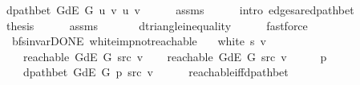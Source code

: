 \begin{isabellebody}
\ {\isachardoublequoteopen}dpath{\isacharunderscore}{\kern0pt}bet\ {\isacharparenleft}{\kern0pt}G{\isachardot}{\kern0pt}dE\ G{\isacharparenright}{\kern0pt}\ {\isacharbrackleft}{\kern0pt}u{\isacharcomma}{\kern0pt}\ v{\isacharbrackright}{\kern0pt}\ u\ v{\isachardoublequoteclose}\isanewline
\ \ \ \ \isamarkupfalse%
\ assms{\isacharparenleft}{\kern0pt}{}{\isacharparenright}{\kern0pt}\isanewline
\ \ \ \ \isamarkupfalse%
\ {\isacharparenleft}{\kern0pt}intro\ edges{\isacharunderscore}{\kern0pt}are{\isacharunderscore}{\kern0pt}dpath{\isacharunderscore}{\kern0pt}bet{\isacharparenright}{\kern0pt}\isanewline
\ \ \isamarkupfalse%
\ {\isacharquery}{\kern0pt}thesis\isanewline
\ \ \ \ \isamarkupfalse%
\ assms{\isacharparenleft}{\kern0pt}{}{\isacharcomma}{\kern0pt}\ {}{\isacharparenright}{\kern0pt}\isanewline
\ \ \ \ \isamarkupfalse%
\ d{\isacharunderscore}{\kern0pt}triangle{\isacharunderscore}{\kern0pt}inequality\isanewline
\ \ \ \ \isamarkupfalse%
\ fastforce\isanewline
{}\isamarkupfalse%
%
\endisatagproof
{\isafoldproof}%
%
\isadelimproof
\isanewline
%
\endisadelimproof
\isanewline
{}\isamarkupfalse%
\ {\isacharparenleft}{\kern0pt}\ bfs{\isacharunderscore}{\kern0pt}invar{\isacharunderscore}{\kern0pt}DONE{\isacharparenright}{\kern0pt}\ white{\isacharunderscore}{\kern0pt}imp{\isacharunderscore}{\kern0pt}not{\isacharunderscore}{\kern0pt}reachable{\isacharcolon}{\kern0pt}\isanewline
\ \ \ {\isachardoublequoteopen}white\ s\ v{\isachardoublequoteclose}\isanewline
\ \ \ {\isachardoublequoteopen}{\isasymnot}\ reachable\ {\isacharparenleft}{\kern0pt}G{\isachardot}{\kern0pt}dE\ G{\isacharparenright}{\kern0pt}\ src\ v{\isachardoublequoteclose}\isanewline
%
\isadelimproof
%
\endisadelimproof
%
\isatagproof
{}\isamarkupfalse%
\isanewline
\ \ \isamarkupfalse%
\ {\isachardoublequoteopen}reachable\ {\isacharparenleft}{\kern0pt}G{\isachardot}{\kern0pt}dE\ G{\isacharparenright}{\kern0pt}\ src\ v{\isachardoublequoteclose}\isanewline
\ \ \isamarkupfalse%
\ \isamarkupfalse%
\ p\ \isanewline
\ \ \ \ {\isachardoublequoteopen}dpath{\isacharunderscore}{\kern0pt}bet\ {\isacharparenleft}{\kern0pt}G{\isachardot}{\kern0pt}dE\ G{\isacharparenright}{\kern0pt}\ p\ src\ v{\isachardoublequoteclose}\isanewline
\ \ \ \ \isamarkupfalse%
\ reachable{\isacharunderscore}{\kern0pt}iff{\isacharunderscore}{\kern0pt}dpath{\isacharunderscore}{\kern0pt}bet\isanewline

\end{isabellebody}
